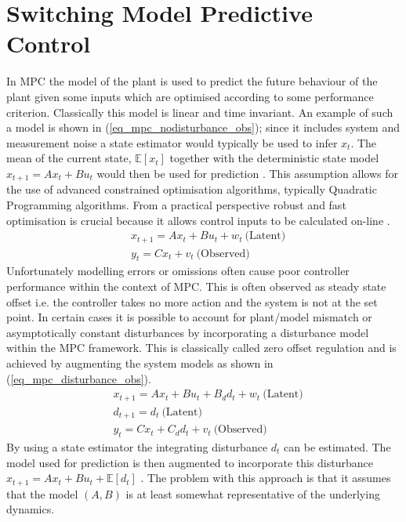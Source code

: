 \section{Switching Model Predictive Control}
\label{sec_switch_mpc_lit}
In MPC the model of the plant is used to predict the future behaviour of the plant given some inputs which are optimised according to some performance criterion. Classically this model is linear and time invariant. An example of such a model is shown in (\ref{eq_mpc_nodisturbance_obs}); since it includes system and measurement noise a state estimator would typically be used to infer $x_t$. The mean of the current state, $\mathbb{E}[x_t]$ together with the deterministic state model $x_{t+1} = Ax_t + Bu_t$ would then be used for prediction \cite{raw}. This assumption allows for the use of advanced constrained optimisation algorithms, typically Quadratic Programming algorithms. From a practical perspective robust and fast optimisation is crucial because it allows control inputs to be calculated on-line \cite{mac}.
\begin{equation}
\begin{aligned}
&x_{t+1} = Ax_t + Bu_t + w_t~\text{(Latent)} \\
&y_t = Cx_t + v_t~\text{(Observed)}
\end{aligned}
\label{eq_mpc_nodisturbance_obs}
\end{equation}
Unfortunately modelling errors or omissions often cause poor controller performance within the context of MPC. This is often observed as steady state offset i.e. the controller takes no more action and the system is not at the set point. In certain cases it is possible to account for plant/model mismatch or asymptotically constant disturbances by incorporating a disturbance model within the MPC framework. This is classically called zero offset regulation \cite{raw} and is achieved by augmenting the system models as shown in (\ref{eq_mpc_disturbance_obs}).
\begin{equation}
\begin{aligned}
&x_{t+1} = Ax_t + Bu_t + B_d d_t + w_t~\text{(Latent)} \\
&d_{t+1} = d_t ~\text{(Latent)}\\
&y_t = Cx_t + C_d d_t + v_t~\text{(Observed)}
\end{aligned}
\label{eq_mpc_disturbance_obs}
\end{equation}
By using a state estimator the integrating disturbance $d_t$ can be estimated. The model used for prediction is then augmented to incorporate this disturbance $x_{t+1} = Ax_t + Bu_t + \mathbb{E}[d_t]$ \cite{lee}. The problem with this approach is that it assumes that the model $(A, B)$ is at least somewhat representative of the underlying dynamics.

